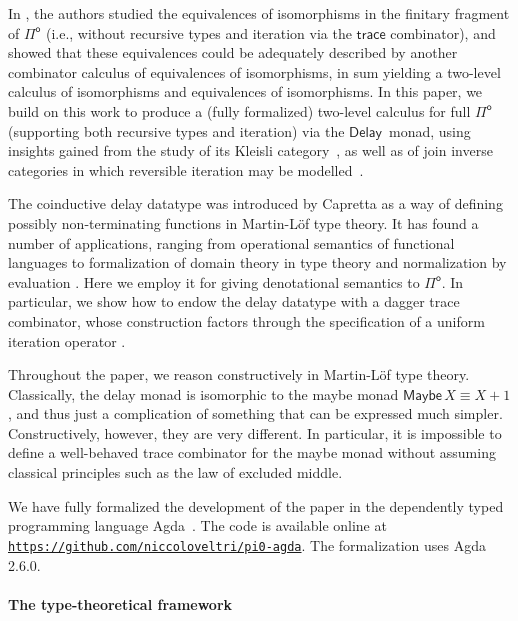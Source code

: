 \documentclass[runningheads,a4paper]{llncs}
\newcommand{\Pio}{\ensuremath{\mathsf{\Pi}^{\mathsf{o}}}}
\newcommand{\trace}{\ensuremath{\mathsf{trace}}}
\newcommand{\Delay}{\ensuremath{\mathsf{Delay}\,}}
\newcommand{\Maybe}{\mathsf{Maybe}}
\begin{document}
In \cite{CaretteS16}, the authors studied the equivalences of isomorphisms in
the finitary fragment of \Pio{} (i.e., without recursive types and iteration
via the \trace{} combinator), and showed that these equivalences could be
adequately described by another combinator calculus of equivalences of
isomorphisms, in sum yielding a two-level calculus of isomorphisms and
equivalences of isomorphisms. In this paper, we build on this work to produce a
(fully formalized) two-level calculus for full \Pio{} (supporting both recursive
types and iteration) via the \Delay{} monad, using insights gained from the
study of its Kleisli category~\cite{UustaluV17,ChapmanUV19,VeltriPhD}, as well
as of join inverse categories in which reversible iteration may be
modelled~\cite{KaarsgaardAG17}.

The coinductive delay datatype was introduced by Capretta
\cite{Capretta05} as a way of defining possibly non-terminating
functions in Martin-L\"of type theory. It has found a number of
applications, ranging from operational semantics of functional
languages \cite{Danielsson12} to formalization of domain theory in
type theory \cite{BentonKV09} and normalization by evaluation
\cite{AbelC14}. Here we employ it for giving denotational semantics to
\Pio. In particular, we show how to endow the delay datatype with a
dagger trace combinator, whose construction factors through the
specification of a uniform iteration operator
\cite{GoncharovSRJ18,GoncharovMR16}.

Throughout the paper, we reason constructively in Martin-L\"of type
theory. Classically, the delay monad is isomorphic to the maybe monad
$\Maybe\,X \equiv X + 1$,
and thus just a complication of something that can be expressed much
simpler. Constructively, however, they are very different. In particular,
it is impossible to define a well-behaved trace combinator for the
maybe monad without assuming classical principles such as the law of
excluded middle.


We have fully formalized the development of the paper in the
dependently typed programming language Agda~\cite{Agda}. The code is
available online at \\ \texttt{\url{https://github.com/niccoloveltri/pi0-agda}}. The
formalization uses Agda 2.6.0.


\paragraph{The type-theoretical framework}
\end{document}
